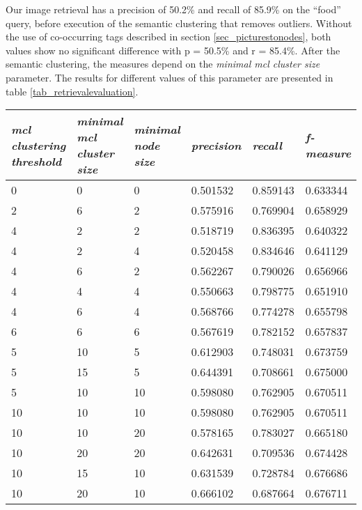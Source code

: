 Our image retrieval has a precision of 50.2\% and recall of 85.9\% on the ``food'' query, before execution of the semantic clustering that removes outliers. Without the use of co-occurring tags described in section \ref{sec_picturestonodes}, both values show no significant difference with p = 50.5\% and r = 85.4\%.
After the semantic clustering, the measures depend on the \emph{minimal mcl cluster size} parameter. The results for different values of this parameter are presented in table \ref{tab_retrievalevaluation}.\\

\begin{table}[h]
    \begin{tabular}{| p{2.5cm}| p{2.5cm}| p{2.5cm} || p{1.5cm} | p{1.5cm} | p{1.7cm} |}
    \hline
    \emph{mcl clustering threshold} & \emph{minimal mcl cluster size} & \emph{minimal node size} & \emph{precision} & \emph{recall} & \emph{f-measure} \\ \hline
    0 	& 0 	& 0 & 0.501532 & 0.859143 & 0.633344 \\ \hline
    2	& 6	& 2	& 0.575916 & 0.769904 & 0.658929 \\ \hline    
    4	& 2	& 2	& 0.518719 & 0.836395 & 0.640322 \\ \hline	      
    4	& 2	& 4	& 0.520458 & 0.834646 & 0.641129 \\ \hline	
    4	& 6	& 2	& 0.562267 & 0.790026 & 0.656966 \\ \hline     
    4 	& 4 	& 4 & 0.550663 & 0.798775 & 0.651910 \\ \hline
 	4	& 6	& 4	& 0.568766 & 0.774278 & 0.655798 \\ \hline    
    6 	& 6 	& 6 & 0.567619 & 0.782152 & 0.657837 \\ \hline  
	5 	& 10 & 5 & 0.612903 & 0.748031 & 0.673759 \\ \hline
    5 	& 15 & 5 & 0.644391 & 0.708661 & 0.675000 \\ \hline  
   	5 	& 10 & 10 & 0.598080 & 0.762905 & 0.670511 \\ \hline 
    10 	& 10 & 10 & 0.598080 & 0.762905 & 0.670511 \\ \hline 
    10 	& 10 & 20 & 0.578165 & 0.783027 & 0.665180 \\ \hline    
    10 	& 20 & 20 & 0.642631 & 0.709536 & 0.674428 \\ \hline
    10 	& 15 & 10 & 0.631539 & 0.728784 & 0.676686 \\ \hline  
    10 	& 20 & 10 & 0.666102 & 0.687664 & 0.676711 \\ \hline

\end{tabular}
\end{table}
